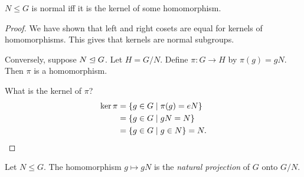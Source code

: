 \begin{proposition}
    $N \le G$ is normal iff it is the kernel of some homomorphism.
\end{proposition}
\begin{proof}
    We have shown that left and right cosets are equal for kernels of
    homomorphisms.
    This gives that kernels are normal subgroups.

    Conversely, suppose $N \trianglelefteq G$.
    Let $H = G/N$.
    Define $\pi\colon G \to H$ by $\pi(g) = gN$.
    Then $\pi$ is a homomorphism.

    What is the kernel of $\pi$?
    \begin{align*}
        \ker \pi &= \set{g \in G \mid \pi(g) = eN} \\
               &= \set{g \in G \mid gN = N} \\
               &= \set{g \in G \mid g \in N} = N. \qedhere
    \end{align*}
\end{proof}

\begin{definition}
    Let $N \le G$.
    The homomorphism $g \mapsto gN$ is the \emph{natural projection}
    of $G$ onto $G/N$.
\end{definition}
